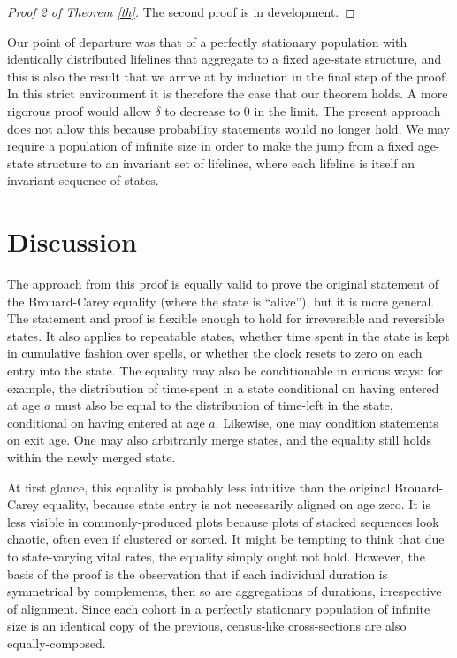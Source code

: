 \documentclass[12pt,oneside,a4paper]{article}
\theoremstyle{definition}
\begin{document}
\begin{proof}[Proof 2 of Theorem \ref{th}]
The second proof is in development.
\end{proof}

Our point of departure was that of a perfectly stationary population with
identically distributed lifelines that aggregate to a fixed age-state structure,
and this is also the result that we arrive at by induction in the final step of
the proof. In this strict environment it is therefore the case that our theorem
holds. A more rigorous proof would allow $\delta$ to decrease to 0 in the
limit. The present approach does not allow this because probability statements
would no longer hold. We may require a population of infinite size in order to
make the jump from a fixed age-state structure to an invariant set of lifelines,
where each lifeline is itself an invariant sequence of states. 

\section{Discussion}
The approach from this proof is equally valid to prove the
original statement of the Brouard-Carey equality (where the state is ``alive''),
but it is more general.
The statement and proof is flexible enough to hold for irreversible and reversible
states. It also applies to repeatable states, whether time spent in the
state is kept in cumulative fashion over spells, or whether the clock resets to
zero on each entry into the state. The equality may also be conditionable in
curious ways: for example, the distribution of time-spent in a state conditional
on having entered at age $a$ must also be equal to the distribution of time-left in
the state, conditional on having entered at age $a$. Likewise, one may condition
statements on exit age. One may also arbitrarily merge states, and the equality
still holds within the newly merged state.

At first glance, this equality is probably less intuitive than the
original Brouard-Carey equality, because state entry is not necessarily aligned
on age zero. It is less visible in commonly-produced plots because plots of
stacked sequences look chaotic, often even if clustered or sorted. It might
be tempting to think that due to state-varying vital rates, the equality simply ought not hold.
However, the basis of the proof is the observation that if each individual
duration is symmetrical by complements, then so are aggregations of
durations, irrespective of alignment. Since each cohort in a perfectly
stationary population of infinite size is an identical copy of the previous,
census-like cross-sections are also equally-composed.
\end{document}
